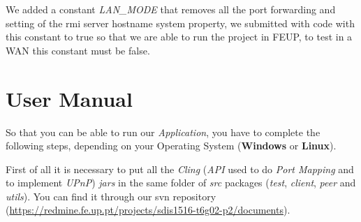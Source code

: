 \documentclass[11pt]{article}
\begin{document}
We added a constant \textit{LAN\_MODE} that removes all the port forwarding and setting of the rmi server hostname system property, we submitted with code with this constant to true so that we are able to run the project in FEUP, to test in a WAN this constant must be false. 

\section{User Manual}

So that you can be able to run our \textit{Application}, you have to complete the following steps, depending on your Operating System (\textbf{Windows} or \textbf{Linux}).

First of all it is necessary to put all the \textit{Cling} (\textit{API} used to do \textit{Port Mapping} and to implement \textit{UPnP}) \textit{jars} in the same folder of \textit{src} packages (\textit{test}, \textit{client}, \textit{peer} and \textit{utils}). You can find it through our svn repository (\url{https://redmine.fe.up.pt/projects/sdis1516-t6g02-p2/documents}).
\end{document}
